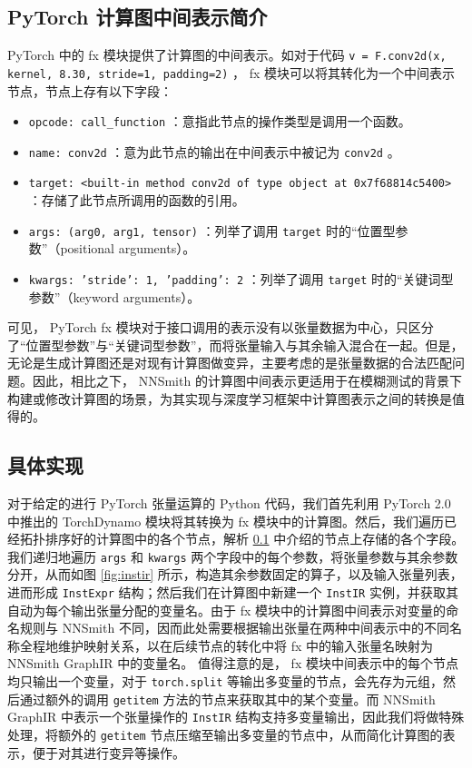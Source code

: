 \subsection{PyTorch 计算图中间表示简介}
\label{fxir}

PyTorch 中的 fx 模块提供了计算图的中间表示。如对于代码 \texttt{v = F.conv2d(x, kernel, 8.30, stride=1, padding=2)} ， fx 模块可以将其转化为一个中间表示节点，节点上存有以下字段：

\begin{itemize}
    \item \texttt{opcode: call\_function} ：意指此节点的操作类型是调用一个函数。
    \item \texttt{name: conv2d} ：意为此节点的输出在中间表示中被记为 \texttt{conv2d} 。
    \item \texttt{target: <built-in method conv2d of type object at 0x7f68814c5400>} ：存储了此节点所调用的函数的引用。
    \item \texttt{args: (arg0, arg1, tensor)} ：列举了调用 \texttt{target} 时的“位置型参数”（positional arguments）。
    \item \texttt{kwargs: {'stride': 1, 'padding': 2}} ：列举了调用 \texttt{target} 时的“关键词型参数”（keyword arguments）。
\end{itemize}

可见， PyTorch fx 模块对于接口调用的表示没有以张量数据为中心，只区分了“位置型参数”与“关键词型参数”，而将张量输入与其余输入混合在一起。但是，无论是生成计算图还是对现有计算图做变异，主要考虑的是张量数据的合法匹配问题。因此，相比之下， NNSmith 的计算图中间表示更适用于在模糊测试的背景下构建或修改计算图的场景，为其实现与深度学习框架中计算图表示之间的转换是值得的。

\subsection{具体实现}

对于给定的进行 PyTorch 张量运算的 Python 代码，我们首先利用 PyTorch 2.0 中推出的 TorchDynamo 模块将其转换为 fx 模块中的计算图。然后，我们遍历已经拓扑排序好的计算图中的各个节点，解析 \ref{fxir} 中介绍的节点上存储的各个字段。我们递归地遍历 \texttt{args} 和 \texttt{kwargs} 两个字段中的每个参数，将张量参数与其余参数分开，从而如图 \ref{fig:instir} 所示，构造其余参数固定的算子，以及输入张量列表，进而形成 \texttt{InstExpr} 结构；然后我们在计算图中新建一个 \texttt{InstIR} 实例，并获取其自动为每个输出张量分配的变量名。由于 fx 模块中的计算图中间表示对变量的命名规则与 NNSmith 不同，因而此处需要根据输出张量在两种中间表示中的不同名称全程地维护映射关系，以在后续节点的转化中将 fx 中的输入张量名映射为 NNSmith GraphIR 中的变量名。
值得注意的是， fx 模块中间表示中的每个节点均只输出一个变量，对于 \texttt{torch.split} 等输出多变量的节点，会先存为元组，然后通过额外的调用 \texttt{getitem} 方法的节点来获取其中的某个变量。而 NNSmith GraphIR 中表示一个张量操作的 \texttt{InstIR} 结构支持多变量输出，因此我们将做特殊处理，将额外的 \texttt{getitem} 节点压缩至输出多变量的节点中，从而简化计算图的表示，便于对其进行变异等操作。

